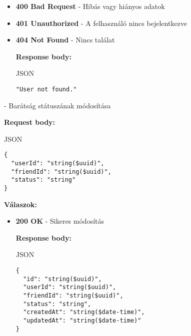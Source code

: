 \documentclass[12pt]{report}
\newcommand{\httpPatch}[1]{\colorbox{patchColor}{\textbf{\textcolor{white}{PATCH}}}~#1}
\begin{document}
\begin{description}
\begin{itemize}
        \textbf{Response body:}
        \begin{codeblock}{JSON}
          \begin{verbatim}
{
  "id": "string($uuid)",
  "createdAt": "string($date-time)",
  "email": "string($email)",
  "firstName": "string",
  "lastName": "string",
  "profilePictureBase64": "string",
  "longestStreak": Number
}
          \end{verbatim}
        \end{codeblock}

      \item \textbf{400 Bad Request} - Hibás vagy hiányos adatok

      \item \textbf{401 Unauthorized} - A felhasználó nincs bejelentkezve

      \item \textbf{404 Not Found} - Nincs találat

        \textbf{Response body:}
        \begin{codeblock}{JSON}
          \begin{verbatim}
"User not found."
          \end{verbatim}
        \end{codeblock}
    \end{itemize}

  \item[\httpPatch{/api/friendship}] - Barátság státuszának módosítása
  
    \vspace{0.5cm}
    \textbf{Request body:}
    \begin{codeblock}{JSON}
      \begin{verbatim}
{
  "userId": "string($uuid)",
  "friendId": "string($uuid)",
  "status": "string"
}
      \end{verbatim}
    \end{codeblock}

    \vspace{0.5cm}
    \textbf{Válaszok:}
    \begin{itemize}
      \item \textbf{200 OK} - Sikeres módosítás

        \textbf{Response body:}
        \begin{codeblock}{JSON}
          \begin{verbatim}
{
  "id": "string($uuid)",
  "userId": "string($uuid)",
  "friendId": "string($uuid)",
  "status": "string",
  "createdAt": "string($date-time)",
  "updatedAt": "string($date-time)"
}
          \end{verbatim}
        \end{codeblock}


\end{itemize}
\end{description}
\end{document}
